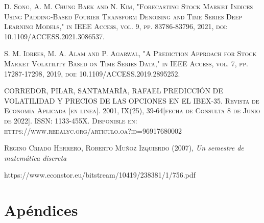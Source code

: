 \documentclass[12pt,a4paper]{article}
\begin{document}
\begin{thebibliography}{X}
 \textsc{D. Song, A. M. Chung Baek and N. Kim, "Forecasting Stock Market Indices Using Padding-Based Fourier Transform Denoising and Time Series Deep Learning Models," in IEEE Access, vol. 9, pp. 83786-83796, 2021, doi: 10.1109/ACCESS.2021.3086537.}

 \textsc{S. M. Idrees, M. A. Alam and P. Agarwal, "A Prediction Approach for Stock Market Volatility Based on Time Series Data," in IEEE Access, vol. 7, pp. 17287-17298, 2019, doi: 10.1109/ACCESS.2019.2895252.}

 \textsc{CORREDOR, PILAR, SANTAMARÍA, RAFAEL PREDICCIÓN DE VOLATILIDAD Y PRECIOS DE LAS OPCIONES EN EL IBEX-35. Revista de Economía Aplicada [en linea]. 2001, IX(25), 39-64[fecha de Consulta 8 de Junio de 2022]. ISSN: 1133-455X. Disponible en: https://www.redalyc.org/articulo.oa?id=96917680002}

 \textsc{Regino Criado Herrero, Roberto Muñoz Izquierdo} \textsc{(2007)},
\textit{Un semestre de matemática discreta
}

\end{thebibliography}
https://www.econstor.eu/bitstream/10419/238381/1/756.pdf
\pagebreak

	\section{Apéndices}
	

\pagebreak
\end{document}
